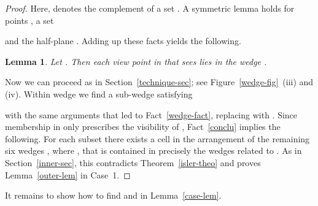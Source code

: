 \documentclass[11pt]{article}
\newtheorem{lemma}{Lemma}
\begin{document}
\begin{proof}
Here,  denotes the complement of a set .
A symmetric lemma holds for points , a set 

and the half-plane . Adding up these facts yields the following.


\begin{lemma}     \label{main-lem}
Let . Then each view point in  that 
sees  lies in the wedge .
\end{lemma}

Now we can proceed as in Section~\ref{technique-sec}; see Figure~\ref{wedge-fig}~(iii) and (iv).
Within wedge  we find a sub-wedge  satisfying
 
with the same arguments that led to Fact~\ref{wedge-fact}, replacing  with
. Since membership in  only prescribes the visibility of ,
Fact~\ref{conclu} implies the following. For each subset 
 there exists a cell in the arrangement of the remaining 
six wedges , where , that is contained in precisely the wedges related to . 
As in Section~\ref{inner-sec}, this contradicts Theorem~\ref{isler-theo} and proves Lemma~\ref{outer-lem} in Case~1.
\end{proof}
It remains to show how to find  and  in Lemma~\ref{case-lem}. 
\end{document}
